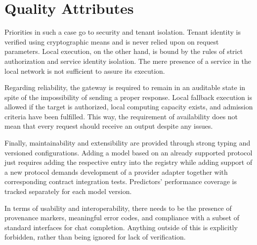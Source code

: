 \documentclass{FastFyp}
\begin{document}
\section{Quality Attributes}
\label{sec:quality-attributes}
Priorities in such a case go to security and tenant isolation.
Tenant identity is verified using cryptographic means and is never relied upon on request parameters.
Local execution, on the other hand, is bound by the rules of strict authorization and service identity isolation. The mere presence of a service in the local network is not sufficient to assure its execution.

Regarding reliability, the gateway is required to remain in an auditable state in spite of the impossibility of sending a proper response. Local fallback execution is allowed if the target is authorized, local computing capacity exists, and admission criteria have been fulfilled. This way, the requirement of availability does not mean that every request should receive an output despite any issues.

Finally, maintainability and extensibility are provided through strong typing and versioned configurations. Adding a model based on an already supported protocol just requires adding the respective entry into the registry while adding support of a new protocol demands development of a provider adapter together with corresponding contract integration tests. Predictors' performance coverage is tracked separately for each model version.

In terms of usability and interoperability, there needs to be the presence of provenance markers, meaningful error codes, and compliance with a subset of standard interfaces for chat completion. Anything outside of this is explicitly forbidden, rather than being ignored for lack of verification.
\end{document}
